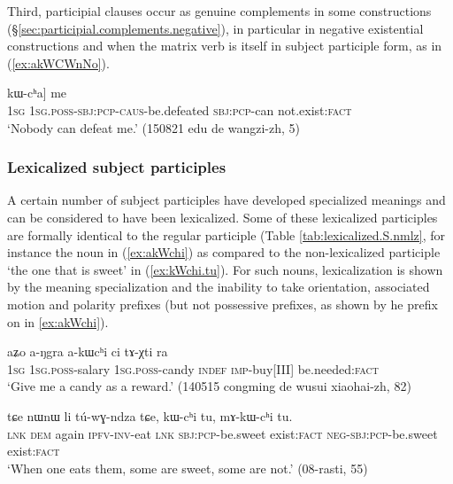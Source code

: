 Third, participial clauses occur as genuine complements in some constructions (§\ref{sec:participial.complements.negative}), in particular in negative existential constructions and when the matrix verb is itself in subject participle form, as in (\ref{ex:akWCWnNo}).

\begin{exe}
\ex \label{ex:akWCWnNo}
\gll  [[aʑo a-kɯ-ɕɯ-nŋo] kɯ-cʰa] me  \\
\textsc{1sg} \textsc{1sg}.\textsc{poss}-\textsc{sbj}:\textsc{pcp}-\textsc{caus}-be.defeated \textsc{sbj}:\textsc{pcp}-can not.exist:\textsc{fact} \\
 \glt `Nobody can defeat me.' (150821 edu de wangzi-zh, 5)
 \end{exe}
 
\subsubsection{Lexicalized subject participles} \label{sec:lexicalized.subject.participle}
A certain number of subject participles have developed specialized meanings and can be considered to have been lexicalized. Some of these lexicalized participles are formally identical to the regular participle (Table  \ref{tab:lexicalized.S.nmlz}, for instance the noun  in (\ref{ex:akWchi})  as compared to the non-lexicalized participle  `the one that is sweet' in (\ref{ex:kWchi.tu}). For such nouns, lexicalization is shown by the meaning specialization and the inability to take orientation, associated motion and polarity prefixes (but not possessive prefixes, as shown by he prefix  on  in \ref{ex:akWchi}).

\begin{exe}
\ex \label{ex:akWchi}
 \gll aʑo a-ŋgra a-kɯcʰi ci tɤ-χti ra \\
 \textsc{1sg} \textsc{1sg}.\textsc{poss}-salary \textsc{1sg}.\textsc{poss}-candy \textsc{indef} \textsc{imp}-buy[III] be.needed:\textsc{fact} \\
\glt `Give me a candy as a reward.' (140515 congming de wusui xiaohai-zh, 82)
\end{exe}

\begin{exe}
\ex \label{ex:kWchi.tu}
 \gll tɕe nɯnɯ li tú-wɣ-ndza tɕe, kɯ-cʰi tu, mɤ-kɯ-cʰi tu. \\
\textsc{lnk} \textsc{dem} again \textsc{ipfv}-\textsc{inv}-eat \textsc{lnk} \textsc{sbj}:\textsc{pcp}-be.sweet exist:\textsc{fact} \textsc{neg}-\textsc{sbj}:\textsc{pcp}-be.sweet exist:\textsc{fact} \\
\glt `When one eats them, some are sweet, some are not.' (08-rasti, 55)
\end{exe}

